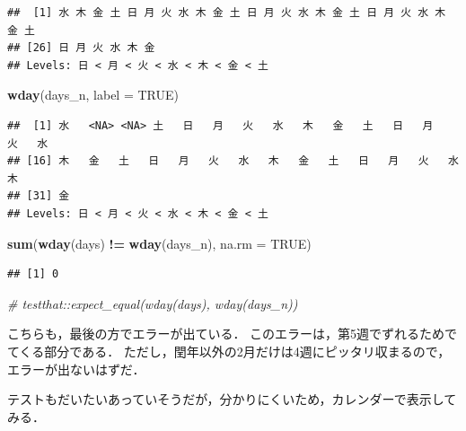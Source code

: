 \documentclass[
]{article}
\newenvironment{Shaded}{\begin{snugshade}}{\end{snugshade}}
\newcommand{\AttributeTok}[1]{\textcolor[rgb]{0.13,0.29,0.53}{#1}}
\newcommand{\CommentTok}[1]{\textcolor[rgb]{0.56,0.35,0.01}{\textit{#1}}}
\newcommand{\ConstantTok}[1]{\textcolor[rgb]{0.56,0.35,0.01}{#1}}
\newcommand{\FunctionTok}[1]{\textcolor[rgb]{0.13,0.29,0.53}{\textbf{#1}}}
\newcommand{\NormalTok}[1]{#1}
\newcommand{\SpecialCharTok}[1]{\textcolor[rgb]{0.81,0.36,0.00}{\textbf{#1}}}
\begin{document}
\begin{verbatim}
##  [1] 水 木 金 土 日 月 火 水 木 金 土 日 月 火 水 木 金 土 日 月 火 水 木 金 土
## [26] 日 月 火 水 木 金
## Levels: 日 < 月 < 火 < 水 < 木 < 金 < 土
\end{verbatim}

\begin{Shaded}
\begin{Highlighting}[]
\FunctionTok{wday}\NormalTok{(days\_n, }\AttributeTok{label =} \ConstantTok{TRUE}\NormalTok{)}
\end{Highlighting}
\end{Shaded}

\begin{verbatim}
##  [1] 水   <NA> <NA> 土   日   月   火   水   木   金   土   日   月   火   水  
## [16] 木   金   土   日   月   火   水   木   金   土   日   月   火   水   木  
## [31] 金  
## Levels: 日 < 月 < 火 < 水 < 木 < 金 < 土
\end{verbatim}

\begin{Shaded}
\begin{Highlighting}[]
\FunctionTok{sum}\NormalTok{(}\FunctionTok{wday}\NormalTok{(days) }\SpecialCharTok{!=} \FunctionTok{wday}\NormalTok{(days\_n), }\AttributeTok{na.rm =} \ConstantTok{TRUE}\NormalTok{)}
\end{Highlighting}
\end{Shaded}

\begin{verbatim}
## [1] 0
\end{verbatim}

\begin{Shaded}
\begin{Highlighting}[]
  \CommentTok{\# testthat::expect\_equal(wday(days), wday(days\_n))}
\end{Highlighting}
\end{Shaded}

こちらも，最後の方でエラーが出ている．
このエラーは，第5週でずれるためでてくる部分である．
ただし，閏年以外の2月だけは4週にピッタリ収まるので，エラーが出ないはずだ．

テストもだいたいあっていそうだが，分かりにくいため，カレンダーで表示してみる．
\end{document}
